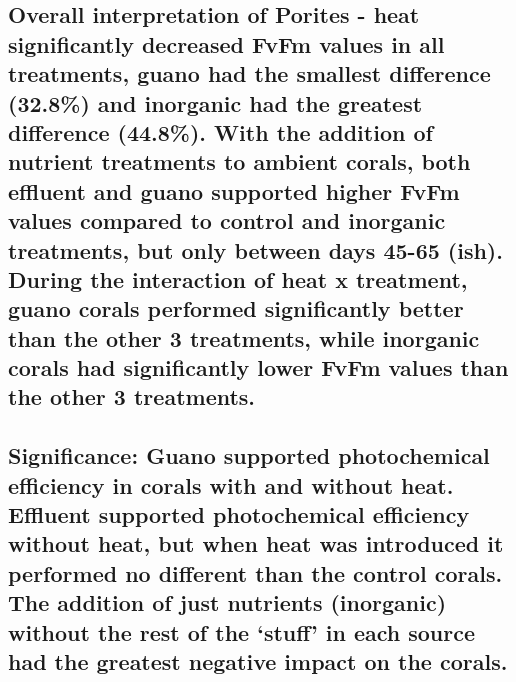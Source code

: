 \documentclass[
]{article}
\begin{document}
\hypertarget{overall-interpretation-of-porites---heat-significantly-decreased-fvfm-values-in-all-treatments-guano-had-the-smallest-difference-32.8-and-inorganic-had-the-greatest-difference-44.8.-with-the-addition-of-nutrient-treatments-to-ambient-corals-both-effluent-and-guano-supported-higher-fvfm-values-compared-to-control-and-inorganic-treatments-but-only-between-days-45-65-ish.-during-the-interaction-of-heat-x-treatment-guano-corals-performed-significantly-better-than-the-other-3-treatments-while-inorganic-corals-had-significantly-lower-fvfm-values-than-the-other-3-treatments.}{%
\subsection{Overall interpretation of Porites - heat significantly
decreased FvFm values in all treatments, guano had the smallest
difference (32.8\%) and inorganic had the greatest difference (44.8\%).
With the addition of nutrient treatments to ambient corals, both
effluent and guano supported higher FvFm values compared to control and
inorganic treatments, but only between days 45-65 (ish). During the
interaction of heat x treatment, guano corals performed significantly
better than the other 3 treatments, while inorganic corals had
significantly lower FvFm values than the other 3
treatments.}\label{overall-interpretation-of-porites---heat-significantly-decreased-fvfm-values-in-all-treatments-guano-had-the-smallest-difference-32.8-and-inorganic-had-the-greatest-difference-44.8.-with-the-addition-of-nutrient-treatments-to-ambient-corals-both-effluent-and-guano-supported-higher-fvfm-values-compared-to-control-and-inorganic-treatments-but-only-between-days-45-65-ish.-during-the-interaction-of-heat-x-treatment-guano-corals-performed-significantly-better-than-the-other-3-treatments-while-inorganic-corals-had-significantly-lower-fvfm-values-than-the-other-3-treatments.}}

\hypertarget{significance-guano-supported-photochemical-efficiency-in-corals-with-and-without-heat.-effluent-supported-photochemical-efficiency-without-heat-but-when-heat-was-introduced-it-performed-no-different-than-the-control-corals.-the-addition-of-just-nutrients-inorganic-without-the-rest-of-the-stuff-in-each-source-had-the-greatest-negative-impact-on-the-corals.}{%
\subsection{Significance: Guano supported photochemical efficiency in
corals with and without heat. Effluent supported photochemical
efficiency without heat, but when heat was introduced it performed no
different than the control corals. The addition of just nutrients
(inorganic) without the rest of the `stuff' in each source had the
greatest negative impact on the
corals.}\label{significance-guano-supported-photochemical-efficiency-in-corals-with-and-without-heat.-effluent-supported-photochemical-efficiency-without-heat-but-when-heat-was-introduced-it-performed-no-different-than-the-control-corals.-the-addition-of-just-nutrients-inorganic-without-the-rest-of-the-stuff-in-each-source-had-the-greatest-negative-impact-on-the-corals.}}
\end{document}

